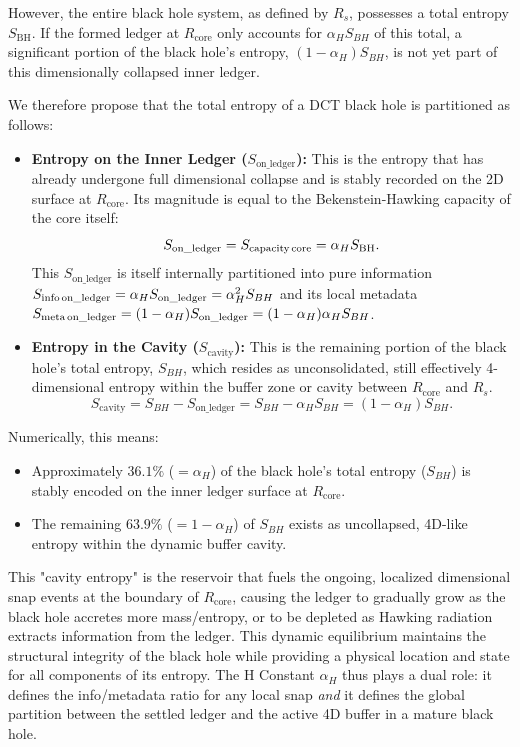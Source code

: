 \documentclass[a4paper, 12pt, oneside]{book}
\numberwithin{equation}{chapter}
\begin{document}
However, the entire black hole system, as defined by $R_s$, possesses a total entropy $S_{\text{BH}}$. If the formed ledger at $R_{\text{core}}$ only accounts for $\alpha_H S_{BH}$ of this total, a significant portion of the black hole's entropy, $(1-\alpha_H)S_{BH}$, is not yet part of this dimensionally collapsed inner ledger.

We therefore propose that the total entropy of a DCT black hole is partitioned as follows:
\begin{itemize}
    \item \textbf{Entropy on the Inner Ledger ($S_{\text{on\_ledger}}$):} This is the entropy that has already undergone full dimensional collapse and is stably recorded on the 2D surface at $R_{\text{core}}$. Its magnitude is equal to the Bekenstein-Hawking capacity of the core itself:
    \[ S_{\text{on\_ledger}} = S_{\text{capacity\,core}} = \alpha_H S_{\text{BH}}. \]
    This $S_{\text{on\_ledger}}$ is itself internally partitioned into pure information \\ $S_{\text{info\,on\_ledger}} = \alpha_H S_{\text{on\_ledger}} = \alpha_H^2 S_{BH}$ and its local metadata \\ $S_{\text{meta\,on\_ledger}} = (1-\alpha_H)S_{\text{on\_ledger}} = (1-\alpha_H)\alpha_H S_{BH}$.

    \item \textbf{Entropy in the Cavity ($S_{\text{cavity}}$):} This is the remaining portion of the black hole's total entropy, $S_{BH}$, which resides as unconsolidated, still effectively 4-dimensional entropy within the buffer zone or cavity between $R_{\text{core}}$ and $R_s$.
    \[ S_{\text{cavity}} = S_{BH} - S_{\text{on\_ledger}} = S_{BH} - \alpha_H S_{BH} = (1-\alpha_H) S_{BH}. \]
\end{itemize}

Numerically, this means:

\begin{itemize}
    \item Approximately $36.1\%$ ($=\alpha_H$) of the black hole's total entropy 
    ($S_{BH}$) is stably encoded on the inner ledger surface at $R_{\text{core}}$.
    \item The remaining $63.9\%$ ($=1-\alpha_H$) of $S_{BH}$ exists as uncollapsed, 4D-like entropy within the dynamic buffer cavity.
\end{itemize}

This "cavity entropy" is the reservoir that fuels the ongoing, localized dimensional snap events at the boundary of $R_{\text{core}}$, causing the ledger to gradually grow as the black hole accretes more mass/entropy, or to be depleted as Hawking radiation extracts information from the ledger. This dynamic equilibrium maintains the structural integrity of the black hole while providing a physical location and state for all components of its entropy. The H Constant $\alpha_H$ thus plays a dual role: it defines the info/metadata ratio for any local snap \emph{and} it defines the global partition between the settled ledger and the active 4D buffer in a mature black hole.
\end{document}
